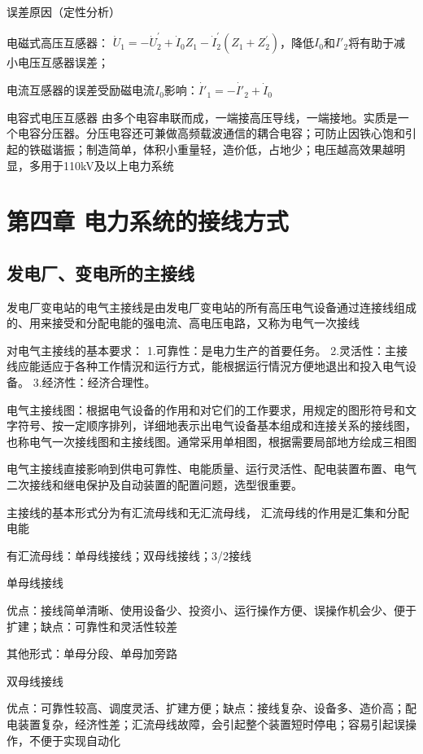 \documentclass[UTF8, 12pt, a4paper]{ctexart}
\begin{document}
误差原因（定性分析）

电磁式高压互感器： $\dot { U } _ { 1 } = - \dot { U } _ { 2 } ^ { \prime } + \dot { I } _ { 0 } Z _ { 1 } - \dot { I } _ { 2 } ^ { \prime }( Z _ { 1 } + Z_ { 2 } ^ { \prime } )$，降低$I_0$和$I'_2$将有助于减小电压互感器误差； 

电流互感器的误差受励磁电流$I_0$影响：$\dot{I'}_1=-\dot{I'}_2+\dot{I}_0$

电容式电压互感器
由多个电容串联而成，一端接高压导线，一端接地。实质是一个电容分压器。分压电容还可兼做高频载波通信的耦合电容；可防止因铁心饱和引起的铁磁谐振；制造简单，体积小重量轻，造价低，占地少；电压越高效果越明显，多用于110kV及以上电力系统
\newpage{}
\section{第四章{} 电力系统的接线方式}
\subsection{发电厂、变电所的主接线}
发电厂变电站的电气主接线是由发电厂变电站的所有高压电气设备通过连接线组成的、用来接受和分配电能的强电流、高电压电路，又称为电气一次接线

对电气主接线的基本要求：
1.可靠性：是电力生产的首要任务。
2.灵活性：主接线应能适应于各种工作情況和运行方式，能根据运行情況方便地退出和投入电气设备。
3.经济性：经济合理性。

电气主接线图：根据电气设备的作用和对它们的工作要求，用规定的图形符号和文字符号、按一定顺序排列，详细地表示出电气设备基本组成和连接关系的接线图，也称电气一次接线图和主接线图。通常采用单相图，根据需要局部地方绘成三相图

电气主接线直接影响到供电可靠性、电能质量、运行灵活性、配电装置布置、电气二次接线和继电保护及自动装置的配置问题，选型很重要。

主接线的基本形式分为有汇流母线和无汇流母线，
汇流母线的作用是汇集和分配电能

有汇流母线：单母线接线；双母线接线；3/2接线

单母线接线

优点：接线简单清晰、使用设备少、投资小、运行操作方便、误操作机会少、便于扩建；缺点：可靠性和灵活性较差

其他形式：单母分段、单母加旁路

双母线接线

优点：可靠性较高、调度灵活、扩建方便；缺点：接线复杂、设备多、造价高；配电装置复杂，经济性差；汇流母线故障，会引起整个装置短时停电；容易引起误操作，不便于实现自动化
\end{document}
